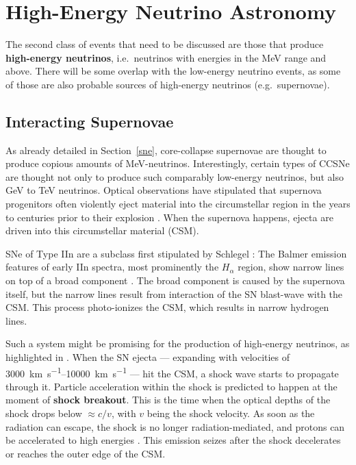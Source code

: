 \section{High-Energy Neutrino Astronomy}\label{he_neutrino_astronomy}

The second class of events that need to be discussed are those that produce \textbf{high-energy neutrinos}, i.e.\ neutrinos with energies in the \unit{\mega\eV} range and above. There will be some overlap with the low-energy neutrino events, as some of those are also probable sources of high-energy neutrinos (e.g.\ supernovae).

\subsection{Interacting Supernovae}\label{interacting_sne}
As already detailed in Section~\ref{sne}, core-collapse supernovae are thought to produce copious amounts of \unit{\mega\eV}-neutrinos. Interestingly, certain types of CCSNe are thought not only to produce such comparably low-energy neutrinos, but also \unit{\giga\eV} to \unit{\tera\eV} neutrinos. Optical observations have stipulated that supernova progenitors often violently eject material into the circumstellar region in the years to centuries prior to their explosion . When the supernova happens, ejecta are driven into this circumstellar material (CSM).

SNe of Type IIn are a subclass first stipulated by Schlegel : The Balmer emission features of early IIn spectra, most prominently the $H_\alpha$ region, show narrow lines on top of a broad component . The broad component is caused by the supernova itself, but the narrow lines result from interaction of the SN blast-wave with the CSM\@. This process photo-ionizes the CSM, which results in narrow hydrogen lines.

Such a system might be promising for the production of high-energy neutrinos, as highlighted in . When the SN ejecta --- expanding with velocities of \SIrange{3000}{10000}{\km\per\s} --- hit the CSM, a shock wave starts to propagate through it. Particle acceleration within the shock is predicted to happen at the moment of \textbf{shock breakout}. This is the time when the optical depths of the shock drops below $\approx c/v$, with $v$ being the shock velocity. As soon as the radiation can escape, the shock is no longer radiation-mediated, and protons can be accelerated to high energies . This emission seizes after the shock decelerates or reaches the outer edge of the CSM\@.

